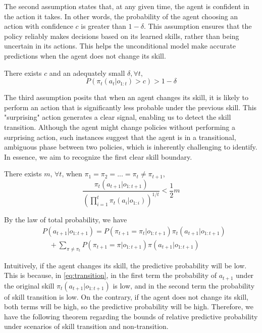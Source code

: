 The second assumption states that, at any given time, the agent is confident in the action it takes. In other words, the probability of the agent choosing an action with confidence $c$ is greater than $1-\delta$. This assumption ensures that the policy reliably makes decisions based on its learned skills, rather than being uncertain in its actions. This helps the unconditional model make accurate predictions when the agent does not change its skill.

\begin{assumption} \label{assumption: confidence}
There exists $c$ and an adequately small $\delta, \forall t,$
\begin{equation}
    P(\pi_t(a_t|o_{1:t})>c) > 1 - \delta
\end{equation}
\end{assumption}

The third assumption posits that when an agent changes its skill, it is likely to perform an action that is significantly less probable under the previous skill. This "surprising" action generates a clear signal, enabling us to detect the skill transition. Although the agent might change policies without performing a surprising action, such instances suggest that the agent is in a transitional, ambiguous phase between two policies, which is inherently challenging to identify. In essence, we aim to recognize the first clear skill boundary.

\begin{assumption} \label{assumption: deviance}
There exists $m$, $\forall t$, when $\pi_1=\pi_2=...=\pi_t \ne \pi_{t+1}$,
\begin{equation}
\frac{\pi_t(a_{t+1}|o_{1:t+1})}{(\prod_{i=1}^t\pi_t(a_{i}|o_{1:i}))^{1/t}} < \frac{1}{2}m
\end{equation}
\end{assumption}

By the law of total probability, we have
\begin{equation}
\begin{split}
\label{eq:transition}
    &P(a_{t+1}|o_{1:t+1}) =P(\pi_{t+1}=\pi_t|o_{1:t+1})\pi_t(a_{t+1}|o_{1:t+1}) \\     &\quad+\sum_{\pi\ne\pi_t}P(\pi_{t+1}=\pi|o_{1:t+1})\pi(a_{t+1}|o_{1:t+1})
\end{split}
\end{equation}

Intuitively, if the agent changes its skill, the predictive probability will be low. This is because, in \cref{eq:transition}, in the first term the probability of $a_{t+1}$ under the original skill $\pi_t(a_{t+1}|o_{1:t+1})$ is low, and in the second term the probability of skill transition is low. On the contrary, if the agent does not change its skill, both terms will be high, so the predictive probability will be high. Therefore, we have the following theorem regarding the bounds of relative predictive probability under scenarios of skill transition and non-transition.

